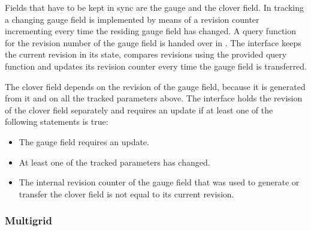 Fields that have to be kept in sync are the gauge and the clover field.
In \openqxd tracking a changing gauge field is implemented by means of a revision counter incrementing every time the residing gauge field has changed.
A query function for the revision number of the gauge field is handed over in .
The interface keeps the current revision in its state, compares revisions using the provided query function and updates its revision counter every time the gauge field is transferred.

The clover field depends on the revision of the gauge field, because it is generated from it and on all the tracked parameters above.
The interface holds the revision of the clover field separately and requires an update if at least one of the following statements is true:
\begin{itemize}
  \item The gauge field requires an update.
  \item At least one of the tracked parameters has changed.
  \item The internal revision counter of the gauge field that was used to generate or transfer the clover field is not equal to its current revision.
\end{itemize}

\subsubsection{Multigrid}

